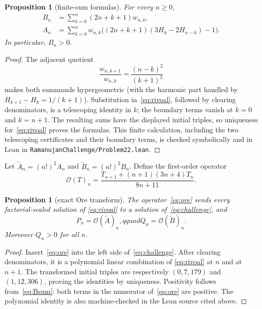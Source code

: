 \documentclass[11pt]{article}
\newtheorem{proposition}[theorem]{Proposition}
\begin{document}
\begin{proposition}[finite-sum formulas]\label{prop:sums}
For every $n\ge0$,
\begin{align}
B_n&=\sum_{k=0}^n(2n+k+1)w_{n,k},                                      \label{eq:Bsum}\\
A_n&=\sum_{k=0}^n w_{n,k}
 \bigl((2n+k+1)(3H_k-2H_{n-k})-1\bigr).                               \label{eq:Asum}
\end{align}
In particular, $B_n>0$.
\end{proposition}

\begin{proof}
The adjacent quotient
\[
 \frac{w_{n,k+1}}{w_{n,k}}=\frac{(n-k)^2}{(k+1)^3}
\]
makes both summands hypergeometric (with the harmonic part handled by
$H_{k+1}-H_k=1/(k+1)$).  Substitution in~\eqref{eq:rivoal}, followed by
clearing denominators, is a telescoping identity in $k$; the boundary terms
vanish at $k=0$ and $k=n+1$.  The resulting sums have the displayed initial
triples, so uniqueness for~\eqref{eq:rivoal} proves the formulas.  This finite
calculation, including the two telescoping certificates and their boundary
terms, is checked symbolically and in Lean in
\texttt{RamanujanChallenge/Problem22.lean}.
\end{proof}

Let $\widetilde A_n=(n!)^2A_n$ and $\widetilde B_n=(n!)^2B_n$.  Define the
first-order operator
\begin{equation}\label{eq:ore}
 \mathcal O(T)_n=
 \frac{T_{n+1}+(n+1)(3n+4)T_n}{8n+11}.
\end{equation}

\begin{proposition}[exact Ore transform]\label{prop:ore}
The operator~\eqref{eq:ore} sends every factorial-scaled solution of
\eqref{eq:rivoal} to a solution of~\eqref{eq:challenge}, and
\[
 P_n=\mathcal O(\widetilde A)_n,qquad
 Q_n=\mathcal O(\widetilde B)_n.
\]
Moreover $Q_n>0$ for all $n$.
\end{proposition}

\begin{proof}
Insert~\eqref{eq:ore} into the left side of~\eqref{eq:challenge}.  After
clearing denominators, it is a polynomial linear combination of
\eqref{eq:rivoal} at $n$ and at $n+1$.  The transformed initial triples are
respectively $(0,7,179)$ and $(1,12,306)$, proving the identities by
uniqueness.  Positivity follows from~\eqref{eq:Bsum}: both terms in the
numerator of~\eqref{eq:ore} are positive.  The polynomial identity is also
machine-checked in the Lean source cited above.
\end{proof}
\end{document}
